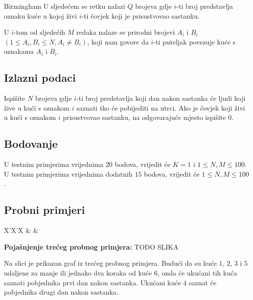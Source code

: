 \begin{statement}[
  problempoints=70,
  timelimit=1 sekunda,
  memorylimit=512 MiB,
]{Birmingham}
U sljedećem se retku nalazi $Q$ brojeva gdje $i$-ti broj predstavlja oznaku
kuće u kojoj živi $i$-ti čovjek koji je prisustvovao sastanku.

U $i$-tom od sljedećih $M$ redaka nalaze se prirodni brojevi $A_i$ i $B_i$ $(1
\le A_i, B_i \le N, A_i \neq B_i)$, koji nam govore da $i$-ti puteljak
povezuje kuće s oznakama $A_i$ i $B_i$.

\subsection*{Izlazni podaci}
Ispišite $N$ brojeva gdje $i$-ti broj predstavlja koji dan nakon sastanka će
ljudi koji žive u kući s oznakom $i$ saznati tko će pobijediti na utrci. Ako
je čovjek koji živi u kući s oznakom $i$ prisustvovao sastanku, na
odgovarajuće mjesto ispišite $0$.

\subsection*{Bodovanje}
U testnim primjerima vrijednima $20$ bodova, vrijedit će $K=1$ i $1 \le N, M
\le 100$.\\
U testnim primjerima vrijednima dodatnih $15$ bodova, vrijedit će $1 \le N, M
\le 100$.

\subsection*{Probni primjeri}
\begin{tabularx}{\textwidth}{X'X'X}
 &
 &
\end{tabularx}

\textbf{Pojašnjenje trećeg probnog primjera:}
TODO SLIKA

Na slici je prikazan graf iz trećeg probnog primjera. Budući da su kuće $1$,
$2$, $3$ i $5$ udaljene za manje ili jednako dva koraka od kuće $6$, onda će
ukućani tih kuća saznati pobjednika prvi dan nakon sastanka. Ukućani kuće $4$
saznat će pobjednika drugi dan nakon sastanka.

\end{statement}


